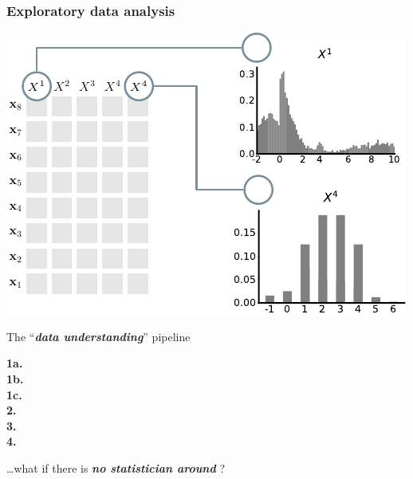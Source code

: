 \documentclass[xcolor={usenames,dvipsnames,svgnames}, compress, aspectratio=169, 11pt]{beamer}
\begin{document}
\begin{frame}[t, htt=bgrey2]
  \frametitle{Exploratory data analysis}
  \large
  \begin{minipage}[t]{0.6\linewidth}
    \vspace{5pt}
    \includegraphics[width=.9\linewidth]{figures/abda-hist-type}
  \end{minipage}\hfill\begin{minipage}[t]{0.4\linewidth}
    \vspace{10pt}
    {The ``\emph{\textbf{data understanding}}'' pipeline}\\[3pt]
    \raggedleft\begin{minipage}[t]{.9\linewidth}
      {\textbf{1a.} \\[-2pt]}
      {\textbf{1b.} \\[-2pt]}
      {\textbf{1c.}\hspace{1pt} \\[-2pt]}
      {\textbf{2.}\hspace{6pt} \\[-2pt]}
      {\textbf{3.}\hspace{6pt} \\[-2pt]}
      {\textbf{4.}\hspace{6pt} \\[2pt]}
    \end{minipage}
    
    {\small\ldots what if there is \emph{\textbf{no statistician around}} ?}
  \end{minipage}  
\end{frame}
\end{document}
